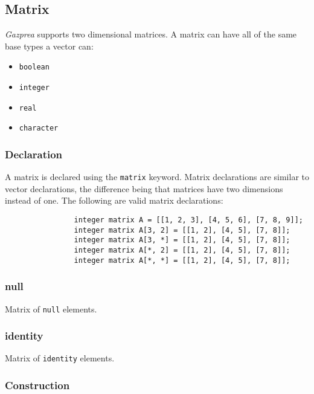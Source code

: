 \documentclass[../../gazprea.tex]{subfiles}
\begin{document}
	\subsection{Matrix}\label{sec:matrix}

		\textit{Gazprea} supports two dimensional matrices. A matrix can have all of the same base types a vector can:

		\begin{itemize}
			\item \texttt{boolean}
			\item \texttt{integer}
			\item \texttt{real}
			\item \texttt{character}
		\end{itemize}

		\subsubsection{Declaration}

			A matrix is declared using the \texttt{matrix} keyword. Matrix declarations are similar to vector
			declarations, the difference being that matrices have two dimensions instead of one. The following are
			valid matrix declarations:

			\begin{lstlisting}
				integer matrix A = [[1, 2, 3], [4, 5, 6], [7, 8, 9]];
				integer matrix A[3, 2] = [[1, 2], [4, 5], [7, 8]];
				integer matrix A[3, *] = [[1, 2], [4, 5], [7, 8]];
				integer matrix A[*, 2] = [[1, 2], [4, 5], [7, 8]];
				integer matrix A[*, *] = [[1, 2], [4, 5], [7, 8]];
			\end{lstlisting}

		\subsubsection{null}

			Matrix of \texttt{null} elements.

		\subsubsection{identity}

			Matrix of \texttt{identity} elements.

		\subsubsection{Construction}
\end{document}
